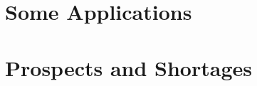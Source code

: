 \documentclass{swfcthesisp}
\begin{document}
\section{Some Applications}

\section{Prospects and Shortages}


\Appendix{}
\printbibliography[heading={bibintoc},title={参考文献}] %
\advisorinfopage{}                 %
\acknowledgmentspage{}             %






\end{document}
